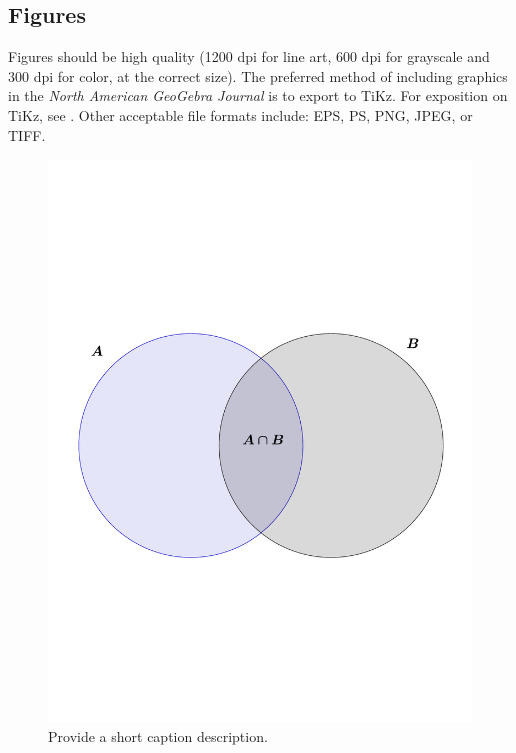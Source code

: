  \subsection{Figures}
Figures should be high quality (1200 dpi for line art, 600 dpi for grayscale and 300 dpi for color, at the correct size). The preferred method of including graphics in the \textit{North American GeoGebra Journal} is to export to TiKz.  For exposition on TiKz, see \citep{quinlan2013geogebra}.   
Other acceptable file formats include: EPS, PS, PNG, JPEG, or TIFF.  
  
 \begin{figure}[h!] %
    \centering
    \includegraphics[scale=0.5]{figs/venn.pdf} 
    \caption{Provide a short caption description.}
    \label{fig:number}
 \end{figure}
 
 
